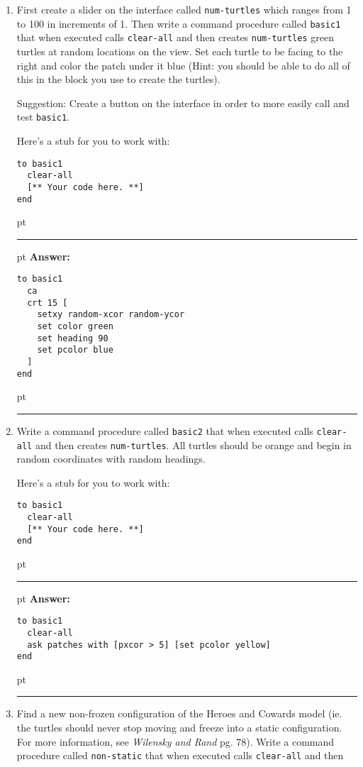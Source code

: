 \documentclass[11pt]{book}
\begin{document}
\begin{enumerate}
\item First create a slider on the interface called \texttt{num-turtles} which ranges from 1 to 100 in increments of 1. Then write a command procedure called \texttt{basic1} that when executed calls \texttt{clear-all} and then creates \texttt{num-turtles} green turtles at random locations on the view. Set each turtle to be facing to the right and color the patch under it blue (Hint: you should be able to do all of this in the block you use to create the turtles).

Suggestion: Create a button on the interface in order to more easily call and test \texttt{basic1}.

Here's a stub for you to work with:
\begin{verbatim}
to basic1
  clear-all
  [** Your code here. **]
end
\end{verbatim}

\ifnum{}
 pt
\hrule
{} pt
{\bf Answer: }
\begin{verbatim}
to basic1
  ca
  crt 15 [
    setxy random-xcor random-ycor
    set color green
    set heading 90
    set pcolor blue
  ]
end
\end{verbatim}
 pt
\hrule
\fi

\item Write a command procedure called \texttt{basic2} that when executed calls \texttt{clear-all} and then creates \texttt{num-turtles}. All turtles should be orange and begin in random coordinates with random headings. 

Here's a stub for you to work with:
\begin{verbatim}
to basic1
  clear-all
  [** Your code here. **]
end
\end{verbatim}

\ifnum{}
 pt
\hrule
{} pt
{\bf Answer: }
\begin{verbatim}
to basic1
  clear-all
  ask patches with [pxcor > 5] [set pcolor yellow]
end
\end{verbatim}
 pt
\hrule
\fi

\item Find a new non-frozen configuration of the Heroes and Cowards model (ie. the turtles should never stop moving and freeze into a static configuration. For more information, see \textit{Wilensky and Rand} pg. 78). Write a command procedure called \texttt{non-static} that when executed calls \texttt{clear-all} and then 


\end{enumerate}
\end{document}

